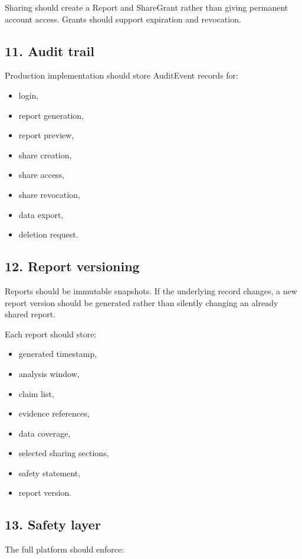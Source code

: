 \documentclass[11pt,a4paper]{article}
\begin{document}
Sharing should create a Report and ShareGrant rather than giving permanent account access. Grants should support expiration and revocation.

\subsection{11. Audit trail}

Production implementation should store AuditEvent records for:

\begin{itemize}
  \item login,
  \item report generation,
  \item report preview,
  \item share creation,
  \item share access,
  \item share revocation,
  \item data export,
  \item deletion request.
\end{itemize}

\subsection{12. Report versioning}

Reports should be immutable snapshots. If the underlying record changes, a new report version should be generated rather than silently changing an already shared report.

Each report should store:

\begin{itemize}
  \item generated timestamp,
  \item analysis window,
  \item claim list,
  \item evidence references,
  \item data coverage,
  \item selected sharing sections,
  \item safety statement,
  \item report version.
\end{itemize}

\subsection{13. Safety layer}

The full platform should enforce:
\end{document}
